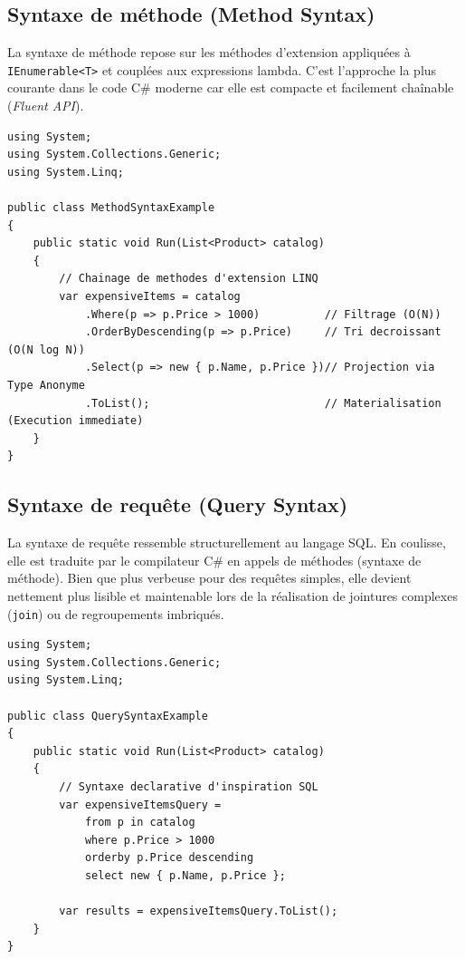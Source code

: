 \subsection{Syntaxe de méthode (Method Syntax)}

La syntaxe de méthode repose sur les méthodes d'extension appliquées à \texttt{IEnumerable<T>} et couplées aux expressions lambda. C'est l'approche la plus courante dans le code C\# moderne car elle est compacte et facilement chaînable (\textit{Fluent API}).

\begin{lstlisting}[language={[Sharp]C}]
using System;
using System.Collections.Generic;
using System.Linq;

public class MethodSyntaxExample
{
    public static void Run(List<Product> catalog)
    {
        // Chainage de methodes d'extension LINQ
        var expensiveItems = catalog
            .Where(p => p.Price > 1000)          // Filtrage (O(N))
            .OrderByDescending(p => p.Price)     // Tri decroissant (O(N log N))
            .Select(p => new { p.Name, p.Price })// Projection via Type Anonyme
            .ToList();                           // Materialisation (Execution immediate)
    }
}
\end{lstlisting}

\subsection{Syntaxe de requête (Query Syntax)}

La syntaxe de requête ressemble structurellement au langage SQL. En coulisse, elle est traduite par le compilateur C\# en appels de méthodes (syntaxe de méthode). Bien que plus verbeuse pour des requêtes simples, elle devient nettement plus lisible et maintenable lors de la réalisation de jointures complexes (\texttt{join}) ou de regroupements imbriqués.

\begin{lstlisting}[language={[Sharp]C}]
using System;
using System.Collections.Generic;
using System.Linq;

public class QuerySyntaxExample
{
    public static void Run(List<Product> catalog)
    {
        // Syntaxe declarative d'inspiration SQL
        var expensiveItemsQuery = 
            from p in catalog
            where p.Price > 1000
            orderby p.Price descending
            select new { p.Name, p.Price };
            
        var results = expensiveItemsQuery.ToList();
    }
}
\end{lstlisting}

